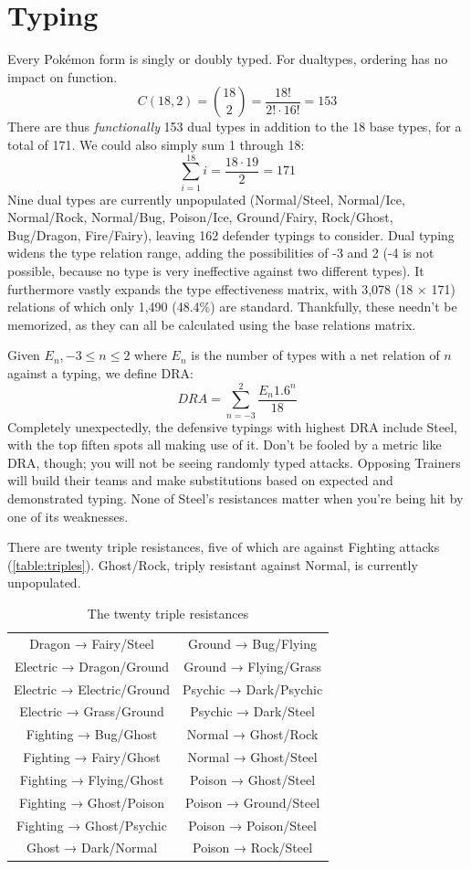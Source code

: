 \section{Typing\label{sec:dualtypes}}
Every Pokémon form is singly or doubly typed.
For dualtypes, ordering has no impact on function.
\[ C(18, 2) = \binom{18}{2} = \frac{18!}{2! \cdot 16!} = 153 \]
There are thus \textit{functionally} 153 dual types in addition to the 18 base types, for a total of 171.
We could also simply sum 1 through 18:
\[ \sum_{i=1}^{18} i = \frac{18 \cdot 19}{2} = 171 \]
Nine dual types are currently unpopulated (Normal/Steel, Normal/Ice, Normal/Rock,
 Normal/Bug, Poison/Ice, Ground/Fairy, Rock/Ghost, Bug/Dragon, Fire/Fairy),
 leaving 162 defender typings to consider.
Dual typing widens the type relation range, adding the possibilities
 of -3 and 2 (-4 is not possible, because no type is very ineffective against
 two different types).
It furthermore vastly expands the type effectiveness matrix,
 with 3,078 (18 × 171) relations of which only 1,490 (48.4\%) are standard.
Thankfully, these needn't be memorized, as they can all be calculated
 using the base relations matrix.

Given $E_{n}, -3 \le n \le 2$ where $E_n$ is the number of types with
  a net relation of $n$ against a typing, we define DRA\@:
\[  DRA = \sum_{n=-3}^{2} \frac{E_{n}1.6^n}{18} \]
Completely unexpectedly, the defensive typings with highest DRA include Steel,
  with the top fiften spots all making use of it.
Don't be fooled by a metric like DRA, though; you will not be seeing
  randomly typed attacks.
Opposing Trainers will build their teams and make substitutions based on
  expected and demonstrated typing.
None of Steel's resistances matter when you're being hit by one of its
  weaknesses.

There are twenty triple resistances, five of which are against Fighting attacks (\autoref{table:triples}).
Ghost/Rock, triply resistant against Normal, is currently unpopulated.
\begin{table}
\centering
\begin{tabular}{cc}
Dragon → Fairy/Steel & Ground → Bug/Flying \\
Electric → Dragon/Ground & Ground → Flying/Grass \\
Electric → Electric/Ground & Psychic → Dark/Psychic \\
Electric → Grass/Ground & Psychic → Dark/Steel \\
Fighting → Bug/Ghost & Normal → Ghost/Rock \\
Fighting → Fairy/Ghost & Normal → Ghost/Steel \\
Fighting → Flying/Ghost & Poison → Ghost/Steel \\
Fighting → Ghost/Poison & Poison → Ground/Steel \\
Fighting → Ghost/Psychic & Poison → Poison/Steel \\
Ghost → Dark/Normal & Poison → Rock/Steel \\
\end{tabular}
\caption{The twenty triple resistances\label{table:triples}}
\end{table}

